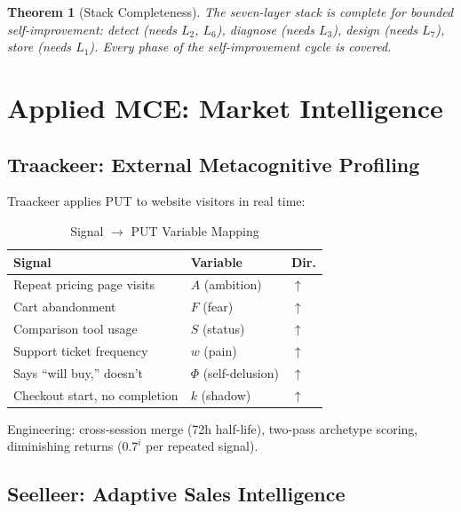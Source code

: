 \documentclass[12pt,a4paper]{article}
\theoremstyle{plain}
\newtheorem{theorem}{Theorem}[section]
\theoremstyle{definition}
\theoremstyle{remark}
\begin{document}
\begin{theorem}[Stack Completeness]
\label{thm:complete}
The seven-layer stack is complete for bounded self-improvement: detect (needs $L_2$, $L_6$), diagnose (needs $L_3$), design (needs $L_7$), store (needs $L_1$). Every phase of the self-improvement cycle is covered.
\end{theorem}

\section{Applied MCE: Market Intelligence}
\label{sec:applied}

\subsection{Traackeer: External Metacognitive Profiling}

Traackeer applies PUT to website visitors in real time:

\begin{table}[H]
\centering
\caption{Signal $\to$ PUT Variable Mapping}
\small
\begin{tabular}{@{}lll@{}}
\toprule
\textbf{Signal} & \textbf{Variable} & \textbf{Dir.} \\
\midrule
Repeat pricing page visits & $A$ (ambition) & $\uparrow$ \\
Cart abandonment & $F$ (fear) & $\uparrow$ \\
Comparison tool usage & $S$ (status) & $\uparrow$ \\
Support ticket frequency & $w$ (pain) & $\uparrow$ \\
Says ``will buy,'' doesn't & $\Phi$ (self-delusion) & $\uparrow$ \\
Checkout start, no completion & $k$ (shadow) & $\uparrow$ \\
\bottomrule
\end{tabular}
\end{table}

Engineering: cross-session merge (72h half-life), two-pass archetype scoring, diminishing returns ($0.7^i$ per repeated signal).

\subsection{Seelleer: Adaptive Sales Intelligence}
\end{document}
